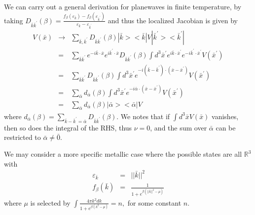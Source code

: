 \documentclass{article}
\newcommand{\beas}{\begin{eqnarray*}}
\newcommand{\enas}{\end{eqnarray*}}
\newcommand{\reals}{\mathbb{R}}
\begin{document}
We can carry out a general derivation for planewaves in finite
temperature, by taking $D_{\bar{k}\bar{k}^\prime}(\beta) =
 \frac{f_\beta(\varepsilon_{\bar{k}})-f_\beta(\varepsilon_{\bar{k}^\prime})}
      {\varepsilon_{\bar{k}}-\varepsilon_{\bar{k}^\prime}}$
and thus the localized Jacobian is given by
\beas
  V(\bar{x}) &\rightarrow&
    \sum_{\bar{k},\bar{k}^\prime} D_{\bar{k}\bar{k}^\prime}(\beta)
    |\bar{k}><\bar{k}| V |\bar{k}^\prime><\bar{k}^\prime|\\
  &=&
  \sum_{\bar{k}\bar{k}^\prime}
  e^{-i\bar{k}\cdot \bar{x}}  e^{i\bar{k}^\prime \cdot \bar{x}}
  D_{\bar{k}\bar{k}^\prime}(\beta)
  \int d^3 \bar{x}^\prime
  e^{ i\bar{k}\cdot \bar{x}^\prime}  e^{-i\bar{k}^\prime \cdot \bar{x}^\prime}
  V(\bar{x}^\prime)\\
  &=&
  \sum_{\bar{k}\bar{k}^\prime}
  D_{\bar{k}\bar{k}^\prime}(\beta)
  \int d^3 \bar{x}^\prime
  e^{-i (\bar{k}-\bar{k}^\prime) \cdot (\bar{x}-\bar{x}^\prime)}
  V(\bar{x}^\prime)\\
  &=&
  \sum_{\bar{\alpha}}
  d_{\bar{\alpha}}(\beta)
  \int d^3 \bar{x}^\prime
  e^{-i \bar{\alpha} \cdot (\bar{x}-\bar{x}^\prime)}
  V(\bar{x}^\prime)\\
  &=&
  \sum_{\bar{\alpha}}
  d_{\bar{\alpha}}(\beta)
  |\bar{\alpha}><\bar{\alpha}|
  V
\enas
where $d_{\bar{\alpha}}(\beta) =
  \sum_{\bar{k}-\bar{k}^\prime = \bar{\alpha}}
  D_{\bar{k}\bar{k}^\prime}(\beta)$.  We notes that if
$\int d^3 \bar{x} V(\bar{x})$ vanishes, then so does the 
integral of the RHS, thus $\nu = 0$, and the sum over $\bar{\alpha}$
can be restricted to $\bar{\alpha} \ne \bar{0}$.

We may consider a more specific metallic case where
the possible states are all $\reals^3$ with
\beas
\varepsilon_{\bar{k}} &=& ||\bar{k}||^2\\
f_\beta(\bar{k}) &=& \frac{1}{1 + e^{\beta(||\bar{k}||^2 - \mu)}}
\enas
where $\mu$ is selected by
$
\int \frac{4 \pi k^2 dk}{1 + e^{\beta(k^2 - \mu)}} = n,
$
for some constant $n$.
\end{document}
